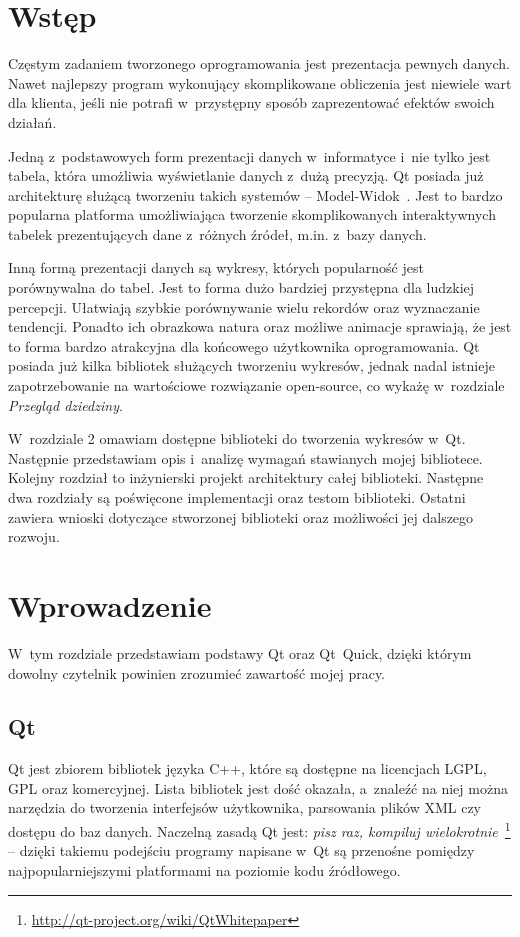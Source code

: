 \chapter*{Wstęp}
Częstym zadaniem tworzonego oprogramowania jest prezentacja pewnych danych. Nawet najlepszy program wykonujący skomplikowane obliczenia jest niewiele wart dla klienta, jeśli nie potrafi w~przystępny sposób zaprezentować efektów swoich działań.
 
Jedną z~podstawowych form prezentacji danych w~informatyce i~nie tylko jest tabela, która umożliwia wyświetlanie danych z~dużą precyzją. Qt posiada już architekturę służącą tworzeniu takich systemów -- Model-Widok~\cite{Qt:Model:View}. Jest to bardzo popularna platforma umożliwiająca tworzenie skomplikowanych interaktywnych tabelek prezentujących dane z~różnych źródeł, m.in. z~bazy danych.

Inną formą prezentacji danych są wykresy, których popularność jest porównywalna do tabel. Jest to forma dużo bardziej przystępna dla ludzkiej percepcji. Ułatwiają szybkie porównywanie wielu rekordów oraz wyznaczanie tendencji. Ponadto ich obrazkowa natura oraz możliwe animacje sprawiają, że jest to forma bardzo atrakcyjna dla końcowego użytkownika oprogramowania.
Qt posiada już kilka bibliotek służących tworzeniu wykresów, jednak nadal istnieje zapotrzebowanie na wartościowe rozwiązanie open-source, co wykażę w~rozdziale \textit{Przegląd dziedziny}.

W~rozdziale 2 omawiam dostępne biblioteki do tworzenia wykresów w~Qt. Następnie przedstawiam opis i~analizę wymagań stawianych mojej bibliotece. Kolejny rozdział to inżynierski projekt architektury całej biblioteki. Następne dwa rozdziały są poświęcone implementacji oraz testom biblioteki. Ostatni  zawiera wnioski dotyczące stworzonej biblioteki oraz możliwości jej dalszego rozwoju. 

\chapter{Wprowadzenie}
W~tym rozdziale przedstawiam podstawy Qt oraz Qt~Quick, dzięki którym dowolny czytelnik powinien zrozumieć zawartość mojej pracy.

\section{Qt}
Qt jest zbiorem bibliotek języka C++, które są dostępne na licencjach LGPL, GPL oraz komercyjnej. Lista bibliotek jest dość okazała, a~znaleźć na niej można narzędzia do tworzenia interfejsów użytkownika, parsowania plików XML czy dostępu do baz danych. Naczelną zasadą Qt jest: \textit{pisz raz, kompiluj wielokrotnie}~\footnote{\url{http://qt-project.org/wiki/QtWhitepaper}} -- dzięki takiemu podejściu programy napisane w~Qt są przenośne pomiędzy najpopularniejszymi platformami na poziomie kodu źródłowego.  


